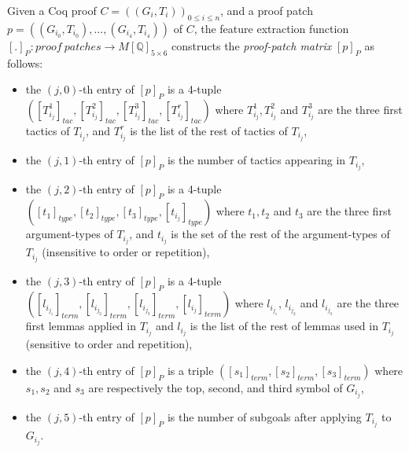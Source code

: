 \begin{definition}\label{def:ptm}
Given a Coq proof $C=((G_i,T_i))_{0\leq i\leq n}$, and a proof patch $p=((G_{i_0},T_{i_0}),\ldots,(G_{i_4},T_{i_4}))$ of $C$, 
the feature extraction function $[.]_P: proof~patches \rightarrow M[\mathbb{Q}]_{5\times 6}$ constructs the \emph{proof-patch matrix} $[p]_P$ 
as follows:

\begin{itemize}
 \item the $(j,0)$-th entry of $[p]_P$ is a 4-tuple $([T_{i_j}^1]_{tac}, [T_{i_j}^2]_{tac},[T_{i_j}^3]_{tac},[T_{i_j}^r]_{tac})$ 
 where $T_{i_j}^1, T_{i_j}^2$ and $T_{i_j}^3$ are the three first tactics of $T_{i_j}$, and $T_{i_j}^r$ is the list of the rest of tactics of $T_{i_j}$,
 \item the $(j,1)$-th entry of $[p]_P$ is the number of tactics appearing in $T_{i_j}$,
 \item the $(j,2)$-th entry of $[p]_P$ is a 4-tuple $([t_1]_{type},[t_2]_{type},[t_3]_{type},[t_{i_j}]_{type})$ where 
 $t_1, t_2$ and $t_3$ are the three first argument-types of $T_{i_j}$, and $t_{i_j}$ is the set of the rest of 
 the argument-types of $T_{i_j}$ (insensitive to order or repetition),
 \item the $(j,3)$-th entry of $[p]_P$ is a 4-tuple  $([l_{i_{j_1}}]_{term},[l_{i_{j_2}}]_{term},[l_{i_{j_3}}]_{term},[l_{i_j}]_{term})$
 where $l_{i_{j_1}}$, $l_{i_{j_2}}$ and $l_{i_{j_3}}$ are the three first lemmas applied in $T_{i_j}$ and $l_{i_j}$ is the list of the rest of lemmas 
used in $T_{i_j}$ (sensitive to order and repetition),
 \item the $(j,4)$-th entry of $[p]_P$ is a triple  $([s_1]_{term},[s_2]_{term},[s_3]_{term})$ where $s_1,s_2$ and $s_3$ are respectively the top, second, and third
 symbol of $G_{i_j}$,
 \item the $(j,5)$-th entry of $[p]_P$ is the number of subgoals after applying $T_{i_j}$ to $G_{i_j}$.
\end{itemize} 
\end{definition}


